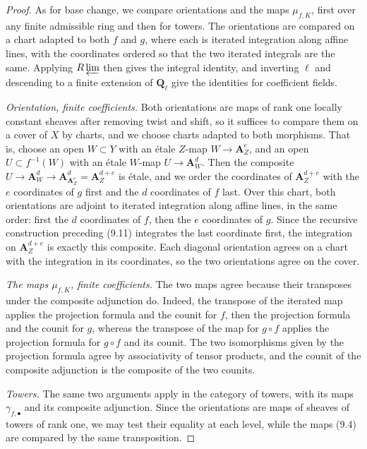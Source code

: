 \documentclass[11pt]{article}
\begin{document}
\begin{proof}[{Proof}]\label{bp80}%
As for base change, we compare orientations and the maps \(\mu_{f,K}\), first over any finite admissible ring and then for towers. The orientations are compared on a chart adapted to both \(f\) and \(g\), where each is iterated integration along affine lines, with the coordinates ordered so that the two iterated integrals are the same. Applying \(R\varprojlim\) then gives the integral identity, and inverting \(\ell\) and descending to a finite extension of \(\mathbf Q_\ell\) give the identities for coefficient fields.

\emph{Orientation, finite coefficients.} Both orientations are maps of rank one locally constant sheaves after removing twist and shift, so it suffices to compare them on a cover of \(X\) by charts, and we choose charts adapted to both morphisms. That is, choose an open \(W\subset Y\) with an étale \(Z\)-map \(W\to\mathbf A^e_Z\), and an open \(U\subset f^{-1}(W)\) with an étale \(W\)-map \(U\to\mathbf A^d_W\). Then the composite \(U\to\mathbf A^d_W\to\mathbf A^d_{\mathbf A^e_Z}=\mathbf A^{d+e}_Z\) is étale, and we order the coordinates of \(\mathbf A^{d+e}_Z\) with the \(e\) coordinates of \(g\) first and the \(d\) coordinates of \(f\) last. Over this chart, both orientations are adjoint to iterated integration along affine lines, in the same order: first the \(d\) coordinates of \(f\), then the \(e\) coordinates of \(g\). Since the recursive construction preceding (9.11) integrates the last coordinate first, the integration on \(\mathbf A^{d+e}_Z\) is exactly this composite. Each diagonal orientation agrees on a chart with the integration in its coordinates, so the two orientations agree on the cover.

\emph{The maps \(\mu_{f,K}\), finite coefficients.} The two maps agree because their transposes under the composite adjunction do. Indeed, the transpose of the iterated map applies the projection formula and the counit for \(f\), then the projection formula and the counit for \(g\), whereas the transpose of the map for \(g\circ f\) applies the projection formula for \(g\circ f\) and its counit. The two isomorphisms given by the projection formula agree by associativity of tensor products, and the counit of the composite adjunction is the composite of the two counits.

\emph{Towers.} The same two arguments apply in the category of towers, with its maps \(\gamma_{f,\bullet}\) and its composite adjunction. Since the orientations are maps of sheaves of towers of rank one, we may test their equality at each level, while the maps (9.4) are compared by the same transposition.
\end{proof}
\end{document}
